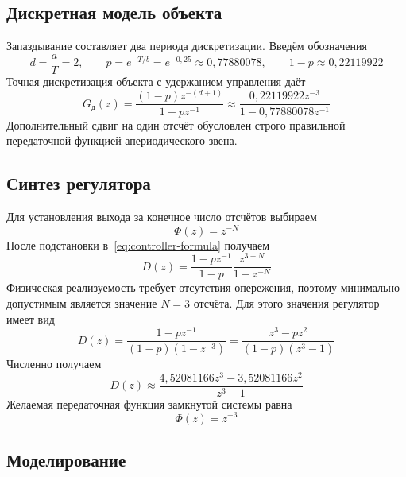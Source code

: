 \subsection{Дискретная модель объекта}

Запаздывание составляет два периода дискретизации. Введём обозначения
\begin{equation}
  d=\frac{a}{T}=2,
  \qquad p=e^{-T/b}=e^{-0{,}25}\approx0{,}77880078,
  \qquad 1-p\approx0{,}22119922
  \label{eq:zoh-coefficients}
\end{equation}
Точная дискретизация объекта с удержанием управления даёт
\begin{equation}
  G_{\text{д}}(z)
  =\frac{(1-p)z^{-(d+1)}}{1-pz^{-1}}
  \approx\frac{0{,}22119922z^{-3}}{1-0{,}77880078z^{-1}}
  \label{eq:zoh-plant}
\end{equation}
Дополнительный сдвиг на один отсчёт обусловлен строго правильной
передаточной функцией апериодического звена.

\subsection{Синтез регулятора}

Для установления выхода за конечное число отсчётов выбираем
\begin{equation}
  \Phi(z)=z^{-N}
  \label{eq:deadbeat-reference}
\end{equation}
После подстановки в~\eqref{eq:controller-formula} получаем
\begin{equation}
  D(z)=\frac{1-pz^{-1}}{1-p}
       \frac{z^{3-N}}{1-z^{-N}}
  \label{eq:deadbeat-family}
\end{equation}
Физическая реализуемость требует отсутствия опережения,
поэтому минимально допустимым является значение $N=3$ отсчёта.
Для этого значения регулятор имеет вид
\begin{equation}
  D(z)=\frac{1-pz^{-1}}{(1-p)(1-z^{-3})}
      =\frac{z^3-pz^2}{(1-p)(z^3-1)}
  \label{eq:deadbeat-controller}
\end{equation}
Численно получаем
\begin{equation}
  D(z)\approx\frac{4{,}52081166z^3-3{,}52081166z^2}{z^3-1}
  \label{eq:deadbeat-controller-numeric}
\end{equation}
Желаемая передаточная функция замкнутой системы равна
\begin{equation}
  \Phi(z)=z^{-3}
  \label{eq:deadbeat-closed-loop}
\end{equation}

\subsection{Моделирование}

